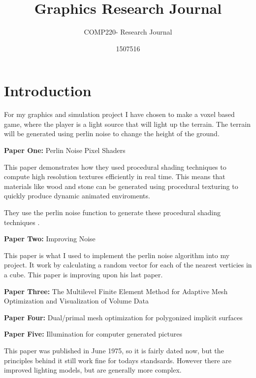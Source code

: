 \documentclass{scrartcl}
\title{Graphics Research Journal}
\subtitle{COMP220- Research Journal}
\author{1507516}
\begin{document}
\maketitle

\abstract{}

\section{Introduction}
For my graphics and simulation project I have chosen to make a voxel based game, where the player is a light source that will light up the terrain. The terrain will be generated using perlin noise to change the height of the ground.


\textbf{Paper One:}
Perlin Noise Pixel Shaders
\cite{hart2001perlin}
\par

This paper demonstrates how they used procedural shading techniques to compute high resolution textures efficiently in real time. This means that materials like wood and stone can be generated using procedural texturing to quickly produce dynamic animated enviroments.

They use the perlin noise function to generate these procedural shading techniques \cite{perlin2002improving}.

\par

\textbf{Paper Two:}
Improving Noise
\cite{perlin2002improving}
\par

This paper is what I used to implement the perlin noise algorithm into my project. It work by calculating a random vector for each of the nearest verticies in a cube.
This paper is improving upon his last paper.

\par 

\textbf{Paper Three:}
The Multilevel Finite Element Method for Adaptive Mesh
Optimization and Visualization of Volume Data
\cite{grosso1997multilevel}
\par

\textbf{Paper Four:}
Dual/primal mesh optimization for polygonized implicit surfaces
\cite{ohtake2002dual}
\par

\textbf{Paper Five:}
Illumination for computer generated pictures
\cite{phong1975illumination}
\par

This paper was published in June 1975, so it is fairly dated now, but the principles behind it still work fine for todays standsards. However there are improved lighting models, but are generally more complex.
\end{document}
